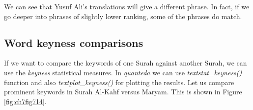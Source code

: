 \documentclass[
]{article}
\newenvironment{Shaded}{\begin{snugshade}}{\end{snugshade}}
\newcommand{\AttributeTok}[1]{\textcolor[rgb]{0.13,0.29,0.53}{#1}}
\newcommand{\CommentTok}[1]{\textcolor[rgb]{0.56,0.35,0.01}{\textit{#1}}}
\newcommand{\ConstantTok}[1]{\textcolor[rgb]{0.56,0.35,0.01}{#1}}
\newcommand{\DecValTok}[1]{\textcolor[rgb]{0.00,0.00,0.81}{#1}}
\newcommand{\FunctionTok}[1]{\textcolor[rgb]{0.13,0.29,0.53}{\textbf{#1}}}
\newcommand{\NormalTok}[1]{#1}
\newcommand{\OtherTok}[1]{\textcolor[rgb]{0.56,0.35,0.01}{#1}}
\newcommand{\SpecialCharTok}[1]{\textcolor[rgb]{0.81,0.36,0.00}{\textbf{#1}}}
\newcommand{\StringTok}[1]{\textcolor[rgb]{0.31,0.60,0.02}{#1}}
\begin{document}
\normalsize

We can see that Yusuf Ali's translations will give a different phrase. In fact, if we go deeper into phrases of slightly lower ranking, some of the phrases do match.

\hypertarget{word-keyness-comparisons}{%
\subsection{Word keyness comparisons}\label{word-keyness-comparisons}}

If we want to compare the keywords of one Surah against another Surah, we can use the \emph{keyness} statistical measures. In \emph{quanteda} we can use \emph{textstat\_keyness()} function and also \emph{textplot\_keyness()} for plotting the results. Let us compare prominent keywords in Surah Al-Kahf versus Maryam. This is shown in Figure \ref{fig:ch7fig714}.

\begin{Shaded}
\end{Shaded}
\end{document}
